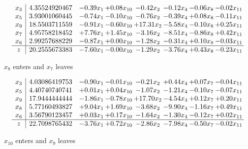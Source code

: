 \documentclass[8pt]{article}
\begin{document}
 \[\begin{array}{c| c c@{\hskip 2pt} c@{\hskip 2pt} c@{\hskip 2pt} c@{\hskip 2pt} c@{\hskip 2pt} c@{\hskip 2pt} }
 x_{3}   &  4.35524920467 & -0.39 x_{1} & +  0.08 x_{10} & -0.42 x_{2} & -0.12 x_{4} & -0.06 x_{8} & -0.02 x_{11}\\
 x_{5}   &  3.93001060445 & -0.74 x_{1} & -0.10 x_{10} & -0.76 x_{2} & -0.39 x_{4} & +  0.08 x_{8} & -0.11 x_{11}\\
 x_{9}   &  18.5503711559 & -0.91 x_{1} & -0.60 x_{10} & + 17.31 x_{2} & -5.58 x_{4} & -0.10 x_{8} & +  0.25 x_{11}\\
 x_{7}   &  4.95758218452 & +  7.76 x_{1} & +  1.45 x_{10} & -3.16 x_{2} & -8.51 x_{4} & -0.86 x_{8} & +  0.42 x_{11}\\
 x_{6}   &  2.99257688229 & -0.87 x_{1} & +  0.00 x_{10} & -1.28 x_{2} & -0.31 x_{4} & +  0.10 x_{8} & -0.03 x_{11}\\
\hline
z    &  20.2555673383 & -7.60 x_{1} & -0.00 x_{10} & -1.29 x_{2} & -3.76 x_{4} & +  0.43 x_{8} & -0.23 x_{11}\\
\end{array}\]


 $ x_{8} $ enters and $ x_{7} $ leaves 

 \[\begin{array}{c| c c@{\hskip 2pt} c@{\hskip 2pt} c@{\hskip 2pt} c@{\hskip 2pt} c@{\hskip 2pt} c@{\hskip 2pt} }
 x_{3}   &  4.03086419753 & -0.90 x_{1} & -0.01 x_{10} & -0.21 x_{2} & +  0.44 x_{4} & +  0.07 x_{7} & -0.04 x_{11}\\
 x_{5}   &  4.40740740741 & +  0.01 x_{1} & +  0.04 x_{10} & -1.07 x_{2} & -1.21 x_{4} & -0.10 x_{7} & -0.07 x_{11}\\
 x_{9}   &  17.9444444444 & -1.86 x_{1} & -0.78 x_{10} & + 17.70 x_{2} & -4.54 x_{4} & +  0.12 x_{7} & +  0.20 x_{11}\\
 x_{8}   &  5.77160493827 & +  9.04 x_{1} & +  1.69 x_{10} & -3.68 x_{2} & -9.90 x_{4} & -1.16 x_{7} & +  0.49 x_{11}\\
 x_{6}   &  3.56790123457 & +  0.03 x_{1} & +  0.17 x_{10} & -1.64 x_{2} & -1.30 x_{4} & -0.12 x_{7} & +  0.02 x_{11}\\
\hline
z    &  22.7098765432 & -3.76 x_{1} & +  0.72 x_{10} & -2.86 x_{2} & -7.98 x_{4} & -0.50 x_{7} & -0.02 x_{11}\\
\end{array}\]


 $ x_{10} $ enters and $ x_{9} $ leaves 
\end{document}
